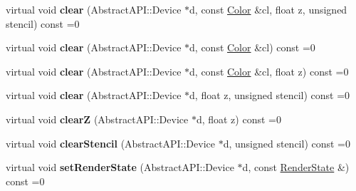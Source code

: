 \begin{DoxyCompactItemize}
\item 
\hypertarget{class_tempest_1_1_abstract_a_p_i_affd423de51d71fbfdad9e185272f9e8b}{virtual void {\bfseries clear} (Abstract\+A\+P\+I\+::\+Device $\ast$d, const \hyperlink{class_tempest_1_1_color}{Color} \&cl, float z, unsigned stencil) const =0}\label{class_tempest_1_1_abstract_a_p_i_affd423de51d71fbfdad9e185272f9e8b}

\item 
\hypertarget{class_tempest_1_1_abstract_a_p_i_a2952dc6512930ecc5dc1261546e8b101}{virtual void {\bfseries clear} (Abstract\+A\+P\+I\+::\+Device $\ast$d, const \hyperlink{class_tempest_1_1_color}{Color} \&cl) const =0}\label{class_tempest_1_1_abstract_a_p_i_a2952dc6512930ecc5dc1261546e8b101}

\item 
\hypertarget{class_tempest_1_1_abstract_a_p_i_ab42f66adfad57306230f650b258ec06b}{virtual void {\bfseries clear} (Abstract\+A\+P\+I\+::\+Device $\ast$d, const \hyperlink{class_tempest_1_1_color}{Color} \&cl, float z) const =0}\label{class_tempest_1_1_abstract_a_p_i_ab42f66adfad57306230f650b258ec06b}

\item 
\hypertarget{class_tempest_1_1_abstract_a_p_i_a32bae4cb4727291d2efcffcebae18e23}{virtual void {\bfseries clear} (Abstract\+A\+P\+I\+::\+Device $\ast$d, float z, unsigned stencil) const =0}\label{class_tempest_1_1_abstract_a_p_i_a32bae4cb4727291d2efcffcebae18e23}

\item 
\hypertarget{class_tempest_1_1_abstract_a_p_i_a185ee467c3ea79eaaa8eac19a86d3504}{virtual void {\bfseries clear\+Z} (Abstract\+A\+P\+I\+::\+Device $\ast$d, float z) const =0}\label{class_tempest_1_1_abstract_a_p_i_a185ee467c3ea79eaaa8eac19a86d3504}

\item 
\hypertarget{class_tempest_1_1_abstract_a_p_i_ac17b047ae75ddabbbed0ee24546ae08f}{virtual void {\bfseries clear\+Stencil} (Abstract\+A\+P\+I\+::\+Device $\ast$d, unsigned stencil) const =0}\label{class_tempest_1_1_abstract_a_p_i_ac17b047ae75ddabbbed0ee24546ae08f}

\item 
\hypertarget{class_tempest_1_1_abstract_a_p_i_a9451b56332bbba29a63034c5e7de1db0}{virtual void {\bfseries set\+Render\+State} (Abstract\+A\+P\+I\+::\+Device $\ast$d, const \hyperlink{class_tempest_1_1_render_state}{Render\+State} \&) const =0}\label{class_tempest_1_1_abstract_a_p_i_a9451b56332bbba29a63034c5e7de1db0}


\end{DoxyCompactItemize}
